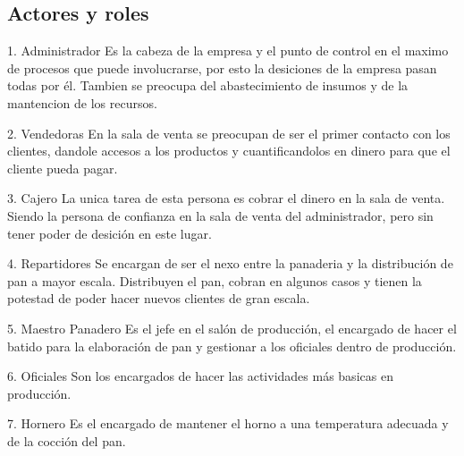 \subsection{Actores y roles}
1.	Administrador
Es la cabeza de la empresa y el punto de control en el maximo de procesos que puede involucrarse, por esto la desiciones de la empresa pasan todas por él. Tambien se preocupa del abastecimiento de insumos y de la mantencion de los recursos. 

2.	Vendedoras
En la sala de venta se preocupan de ser el primer contacto con los clientes, dandole accesos a los productos y cuantificandolos en dinero para que el cliente pueda pagar.

3.	Cajero
La unica tarea de esta persona es cobrar el dinero en la sala  de venta. Siendo  la persona de confianza en la sala de venta del administrador, pero sin tener poder de desición en este lugar.

4.	Repartidores
Se encargan de ser el nexo entre la panaderia y la distribución de pan a mayor escala. Distribuyen el pan, cobran en algunos casos y tienen la potestad de poder hacer nuevos clientes de gran escala.

5.	Maestro Panadero
Es el jefe en el salón de producción, el encargado de hacer el batido para la elaboración de pan y gestionar a los oficiales dentro de producción. 

6.	Oficiales
Son los encargados de hacer las actividades más basicas en producción.

7.	Hornero
Es el encargado de mantener el horno a una temperatura adecuada y de la cocción del pan. 
